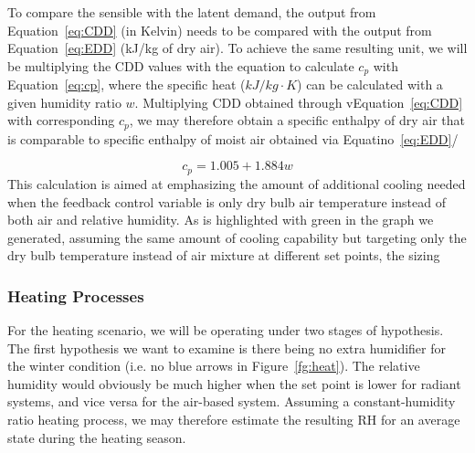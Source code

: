     To compare the sensible with the latent demand, the output from Equation~\ref{eq:CDD} (in Kelvin) needs to be compared with the output from Equation~\ref{eq:EDD} (kJ/kg of dry air). To achieve the same resulting unit, we will be multiplying the CDD values with the equation to calculate $c_p$ with Equation~\ref{eq:cp}, where the specific heat ($kJ/kg\cdot K$) can be calculated with a given  humidity ratio $w$. Multiplying CDD obtained through vEquation~\ref{eq:CDD} with corresponding $c_p$, we may therefore obtain a specific enthalpy of dry air that is comparable to specific enthalpy of moist air obtained via Equatino~\ref{eq:EDD}/

    \begin{equation}
    c_p = 1.005 + 1.884 w \label{eq:cp}
    \end{equation}
    This calculation is aimed at emphasizing the amount of additional cooling needed when the feedback control variable is only dry bulb air temperature instead of both air and relative humidity. As is highlighted with green in the graph we generated, assuming the same amount of cooling capability but targeting only the dry bulb temperature instead of air mixture at different set points, the sizing  

\subsubsection{Heating Processes}
    For the heating scenario, we will be operating under two stages of hypothesis. The first hypothesis we want to examine is there being no extra humidifier for the winter condition (i.e. no blue arrows in Figure~\ref{fg:heat}). The relative humidity would obviously be much higher when the set point is lower for radiant systems, and vice versa for the air-based system. Assuming a constant-humidity ratio heating process, we may therefore estimate the resulting RH for an average state during the heating season.  

